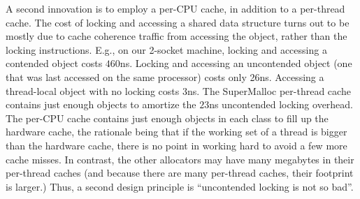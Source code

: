 \documentclass[pldi]{sigplanconf-pldi15}
\begin{document}
A second innovation is to employ a per-CPU cache, in addition to a
per-thread cache.  The cost of locking and accessing a shared data
structure turns out to be mostly due to cache coherence traffic from
accessing the object, rather than the locking instructions.  E.g., on
our 2-socket machine, locking and accessing a contended object costs
$460$ns.  Locking and accessing an uncontended object (one that was
last accessed on the same processor) costs only 26ns.  Accessing a
thread-local object with no locking costs $3$ns.  The SuperMalloc
per-thread cache contains just enough objects to amortize the $23$ns
uncontended locking overhead.  The per-CPU cache contains just enough
objects in each class to fill up the hardware cache, the rationale
being that if the working set of a thread is bigger than the hardware
cache, there is no point in working hard to avoid a few more cache
misses.  In contrast, the other allocators may have many megabytes in
their per-thread caches (and because there are many per-thread caches,
their footprint is larger.)  Thus, a second design principle is
``uncontended locking is not so bad''.



\end{document}
